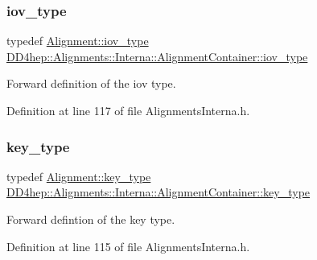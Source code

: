 \subsubsection{\texorpdfstring{iov\+\_\+type}{iov\_type}}
{\footnotesize\ttfamily typedef \hyperlink{class_d_d4hep_1_1_alignments_1_1_alignment_afd988c803da5a514d8fa255784f29462}{Alignment\+::iov\+\_\+type} \hyperlink{class_d_d4hep_1_1_alignments_1_1_interna_1_1_alignment_container_a99b2a8d269ecefcf1b59269ad94e75e3}{D\+D4hep\+::\+Alignments\+::\+Interna\+::\+Alignment\+Container\+::iov\+\_\+type}}



Forward definition of the iov type. 



Definition at line 117 of file Alignments\+Interna.\+h.

\hypertarget{class_d_d4hep_1_1_alignments_1_1_interna_1_1_alignment_container_a7395f0e25d9e524d2a2bd7df0f4364e6}{}\label{class_d_d4hep_1_1_alignments_1_1_interna_1_1_alignment_container_a7395f0e25d9e524d2a2bd7df0f4364e6} 
\subsubsection{\texorpdfstring{key\+\_\+type}{key\_type}}
{\footnotesize\ttfamily typedef \hyperlink{class_d_d4hep_1_1_alignments_1_1_alignment_ab824a65f935a0c79b9ea1a7a85014b88}{Alignment\+::key\+\_\+type} \hyperlink{class_d_d4hep_1_1_alignments_1_1_interna_1_1_alignment_container_a7395f0e25d9e524d2a2bd7df0f4364e6}{D\+D4hep\+::\+Alignments\+::\+Interna\+::\+Alignment\+Container\+::key\+\_\+type}}



Forward defintion of the key type. 



Definition at line 115 of file Alignments\+Interna.\+h.

\hypertarget{class_d_d4hep_1_1_alignments_1_1_interna_1_1_alignment_container_a64a96ad5b67f6e67b12fd3aaaa8bbcb8}{}\label{class_d_d4hep_1_1_alignments_1_1_interna_1_1_alignment_container_a64a96ad5b67f6e67b12fd3aaaa8bbcb8} 
